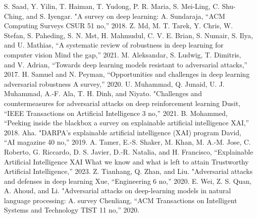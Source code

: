 \documentclass[10pt, conference, a4paper, final]{IEEEtran}
\begin{document}
\begin{thebibliography}{01}

    S. Saad, Y. Yilin, T. Haiman, T. Yudong, P. R. Maria, S. Mei-Ling, C. Shu-Ching, and S. Iyengar. "A survey on deep learning: A. Sundaraja, “ACM Computing Surveys CSUR 51 no,” 2018.
     Z. Md, M. T. Tarek, Y. Chris, W. Stefan, S. Paheding, S. N. Mst, H. Mahmudul, C. V. E. Brian, 
    S. Numair, S. Ilya, and U. Mathias, “A systematic review of robustness in deep learning for computer vision Mind the gap,” 2021.
    M. Aleksandar, S. Ludwig, T. Dimitris, and V. Adrian, “Towards deep learning models resistant to adversarial attacks,” 2017.
    H. Samuel and N. Peyman, “Opportunities and challenges in deep learning adversarial robustness A survey,” 2020.
    U. Muhammad, Q. Junaid, U. J. Muhammad, A.-F. Ala, T. H. Dinh, and Niyato. "Challenges and countermeasures for adversarial attacks on deep reinforcement learning Dusit, “IEEE Transactions on Artificial Intelligence 3 no,” 2021.
    B. Mohammed, “Peeking inside the blackbox a survey on explainable artificial intelligence XAI,” 2018.
    Aha. "DARPA’s explainable artificial intelligence (XAI) program David, “AI magazine 40 no,” 2019.
    A. Tamer, E.-S. Shaker, M. Khan, M. A.-M. Jose, C. Roberto, G. Riccardo, D. S. Javier, D.-R. Natalia, and H. Francisco, “Explainable Artificial Intelligence XAI What we know and what is left to attain Trustworthy Artificial Intelligence,” 2023.
    Z. Tianhang, Q. Zhan, and Liu. "Adversarial attacks and defenses in deep learning Xue, “Engineering 6 no,” 2020.
    E. Wei, Z. S. Quan, A. Ahoud, and Li. "Adversarial attacks on deep-learning models in natural language processing: A. survey Chenliang, “ACM Transactions on Intelligent Systems and Technology TIST 11 no,” 2020.






\end{thebibliography}
\end{document}
